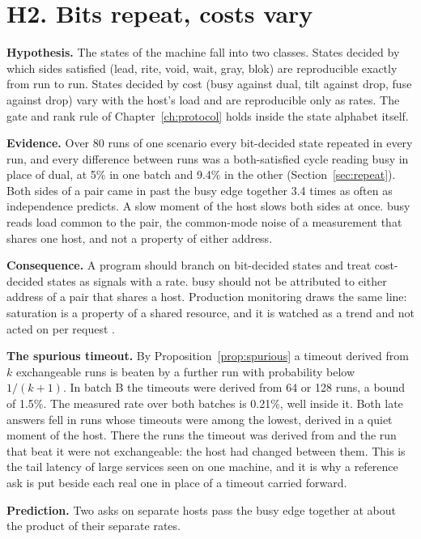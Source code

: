 \section{H2. Bits repeat, costs vary}
\label{sec:h2}

\textbf{Hypothesis.} The states of the machine fall into two classes. States decided by which
sides satisfied (lead, rite, void, wait, gray, blok) are reproducible exactly from run to run. States
decided by cost (busy against dual, tilt against drop, fuse against drop) vary with the host's load
and are reproducible only as rates. The gate and rank rule of Chapter~\ref{ch:protocol} holds
inside the state alphabet itself.

\textbf{Evidence.} Over 80 runs of one scenario every bit-decided state repeated in every run,
and every difference between runs was a both-satisfied cycle reading busy in place of dual, at 5\% in
one batch and 9.4\% in the other (Section~\ref{sec:repeat}). Both sides of a pair came in past the
busy edge together 3.4 times as often as independence predicts. A slow moment of the host slows
both sides at once. busy reads load common to the pair, the common-mode noise of a measurement
that shares one host, and not a property of either address.

\textbf{Consequence.} A program should branch on bit-decided states and treat cost-decided states
as signals with a rate. busy should not be attributed to either address of a pair that shares a
host. Production monitoring draws the same line: saturation is a property of a shared resource,
and it is watched as a trend and not acted on per request \cite{src:SRE}.

\textbf{The spurious timeout.} By Proposition~\ref{prop:spurious} a timeout derived from \(k\)
exchangeable runs is beaten by a further run with probability below \(1/(k+1)\). In batch B the
timeouts were derived from 64 or 128 runs, a bound of 1.5\%. The measured rate over both batches
is 0.21\%, well inside it. Both late answers fell in runs whose timeouts were among the lowest,
derived in a quiet moment of the host. There the runs the timeout was derived from and the run
that beat it were not exchangeable: the host had changed between them. This is the tail latency
of large services \cite{src:Dean-Barroso} seen on one machine, and it is why a reference ask is
put beside each real one in place of a timeout carried forward.

\textbf{Prediction.} Two asks on separate hosts pass the busy edge together at about the product
of their separate rates.

